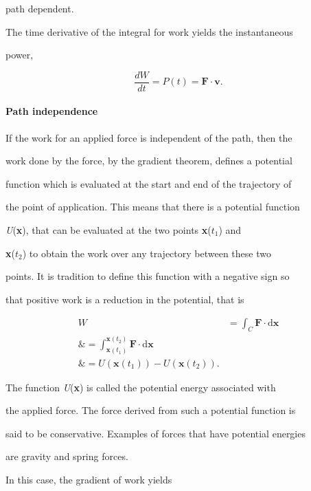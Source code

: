 path dependent.



The time derivative of the integral for work yields the instantaneous

power,



$$\frac{dW}{dt} = P(t) = \mathbf{F}\cdot \mathbf{v} .$$



\paragraph{Path independence}



If the work for an applied force is independent of the path, then the

work done by the force, by the gradient theorem, defines a potential

function which is evaluated at the start and end of the trajectory of

the point of application. This means that there is a potential function

\textit{U}(\textbf{x}), that can be evaluated at the two points \textbf{x}($t _1$) and

\textbf{x}($t _2$) to obtain the work over any trajectory between these two

points. It is tradition to define this function with a negative sign so

that positive work is a reduction in the potential, that is



\begin{align}
W &= \int _C \mathbf{F} \cdot \mathrm{d}\mathbf{x} \\\&=  \int _{\mathbf{x}(t _1)}^{\mathbf{x}(t _2)} \mathbf{F} \cdot \mathrm{d}\mathbf{x} \\\&=  U(\mathbf{x}(t _1)) - U(\mathbf{x}(t _2)).
\end{align}



The function \textit{U}(\textbf{x}) is called the potential energy associated with

the applied force. The force derived from such a potential function is

said to be conservative. Examples of forces that have potential energies

are gravity and spring forces.



In this case, the gradient of work yields



